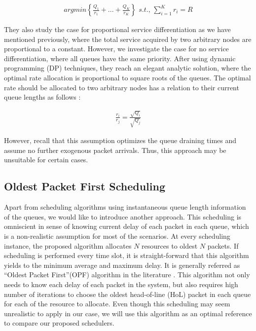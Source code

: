 \begin{align}
arg min  \left\{ \frac{Q_{1}}{r_{1}} +  ... + \frac{Q_{K}}{r_{K}} \right\} \, \, s.t., \, \sum\limits_{i=1}^K r_{i} = R
\end{align} 

They also study the case for proportional service differentiation as we have mentioned previously, where the total service acquired by two arbitrary nodes are proportional to a constant. However, we investigate the case for no service differentiation, where all queues have the same priority. After using dynamic programming (DP) techniques, they reach an elegant analytic solution, where the optimal rate allocation is proportional to square roots of the queues. The optimal rate should be allocated to two arbitrary nodes has a relation to their current queue lengths as follows :

\begin{align}
\frac{r_{i}}{r_{j}} = \frac{\sqrt{Q_{i}}}{\sqrt{Q_{j}}} 
\end{align} 

However, recall that this assumption optimizes the queue draining times and assume no further exogenous packet arrivals. Thus, this approach may be unsuitable for certain cases. 

\subsection{Oldest Packet First Scheduling}

Apart from scheduling algorithms using instantaneous queue length information of the queues, we would like to introduce another approach. This scheduling is omniscient in sense of knowing current delay of each packet in each queue, which is a non-realistic assumption for most of the scenarios. At every scheduling instance, the proposed algorithm allocates $N$ resources to oldest $N$ packets. If scheduling is performed every time slot, it is straight-forward that this algorithm yields to the minimum average and maximum delay. It is generally referred as \textquotedblleft Oldest Packet First\textquotedblright (OPF) algorithm in the literature \cite{homan2002enhanced}. This algorithm not only needs to know each delay of each packet in the system, but also requires high number of iterations to choose the oldest head-of-line (HoL) packet in each queue for each of the resource to allocate. Even though this scheduling may seem unrealistic to apply in our case, we will use this algorithm as an optimal reference to compare our proposed schedulers.

